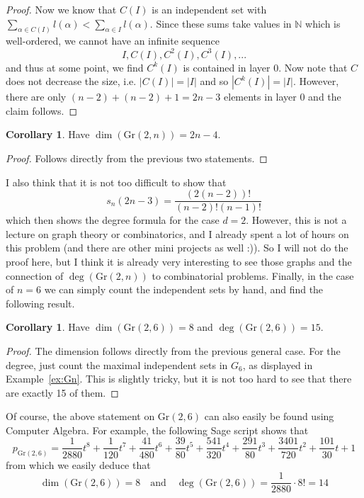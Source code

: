 \documentclass{scrartcl}
\newcommand{\N}{\mathbb{N}}
\newcommand{\Gr}{\mathrm{Gr}}
\theoremstyle{definition}
\newtheorem{corollary}[definition]{Corollary}
\begin{document}
\begin{proof}
    Now we know that $C(I)$ is an independent set with $\sum_{\alpha \in C(I)} l(\alpha) < \sum_{\alpha \in I} l(\alpha)$.
    Since these sums take values in $\N$ which is well-ordered, we cannot have an infinite sequence
    \begin{equation*}
        I, C(I), C^2(I), C^3(I), ...
    \end{equation*}
    and thus at some point, we find $C^k(I)$ is contained in layer 0.
    Now note that $C$ does not decrease the size, i.e. $|C(I)| = |I|$ and so $|C^k(I)| = |I|$.
    However, there are only $(n - 2) + (n - 2) + 1 = 2n - 3$ elements in layer 0 and the claim follows.
\end{proof}
\begin{corollary}
    Have $\dim(\Gr(2, n)) = 2n - 4$.
\end{corollary}
\begin{proof}
    Follows directly from the previous two statements.
\end{proof}
I also think that it is not too difficult to show that
\begin{equation*}
    s_n(2n - 3) = \frac {(2(n - 2))!} {(n - 2)! (n - 1)!}
\end{equation*}
which then shows the degree formula for the case $d = 2$.
However, this is not a lecture on graph theory or combinatorics, and I already spent a lot of hours on this problem (and there are other mini projects as well :)).
So I will not do the proof here, but I think it is already very interesting to see those graphs and the connection of $\deg(\Gr(2, n))$ to combinatorial problems.
Finally, in the case of $n = 6$ we can simply count the independent sets by hand, and find the following result.
\begin{corollary}
    Have $\dim(\Gr(2, 6)) = 8$ and $\deg(\Gr(2, 6)) = 15$.
\end{corollary}
\begin{proof}
    The dimension follows directly from the previous general case.
    For the degree, just count the maximal independent sets in $G_6$, as displayed in Example~\ref{ex:Gn}.
    This is slightly tricky, but it is not too hard to see that there are exactly 15 of them.
\end{proof}
Of course, the above statement on $\Gr(2, 6)$ can also easily be found using Computer Algebra.
For example, the following Sage script shows that
\begin{equation*}
    p_{\Gr(2, 6)} = \frac 1 {2880} t^8 + \frac 1 {120} t^7 + \frac {41} {480} t^6 + \frac {39} {80} t^5 + \frac {541} {320} t^4 + \frac {291} {80} t^3 + \frac {3401} {720} t^2 + \frac {101} {30} t + 1
\end{equation*}
from which we easily deduce that
\begin{equation*}
    \dim(\Gr(2, 6)) = 8 \quad \text{and} \quad \deg(\Gr(2, 6)) = \frac 1 {2880} \cdot 8! = 14
\end{equation*}

\printbibliography
\end{document}
